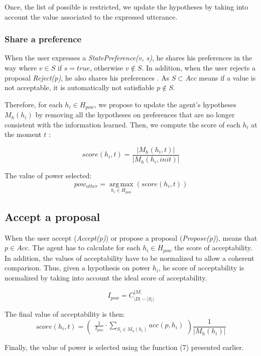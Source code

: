 \documentclass[conference, letterpaper]{IEEEtran}
\begin{document}
Once, the list of possible is restricted, we update the hypotheses by taking into account the value associated to the expressed utterance.

\subsubsection{Share a preference}
When the user expresses a \emph{StatePreference(v, s)}, he shares his preferences in the way where $v \in S$ if $s =true$, otherwise $v \notin S$. 
In addition, when the user rejects a proposal \emph{Reject(p)}, he also shares his preferences . As $S \subset Acc$ means if a value is not acceptable, it is automatically not satisfiable $p \notin S$. 

Therefore, for each  $h_i \in H_{pow}$, we propose to update the agent's hypotheses $M_h(h_i)$ by removing all the hypotheses on preferences that are no longer consistent with the information learned. 
Then, we compute the score of each $h_i$ at the moment $t$ :

$$score(h_i,t) = \frac{|M_h(h_i, t)|}{|M_h(h_i, init)|}$$

The value of power selected:
\begin{equation}
pow_{other} = \operatorname*{arg\,max}_{h_i \in H_{pow}} ( score(h_i,t))
\end{equation}

\subsection{Accept a proposal}
When the user accept (\emph{Accept(p)}) or propose a proposal (\emph{Propose(p)}), means that $p \in Acc$. 
The agent has to calculate for each $h_i \in H_{pow}$ the score of acceptability. In addition, the values of acceptability have to be normalized to allow a coherent comparison. Thus, given a hypothesis on power $h_i$, he score of acceptability is normalized by taking into account the ideal score of acceptability.

$$I_{pow} =  C_{|D|-|S_i|}^{|M|}$$


The final value of acceptability is then:
\begin{equation}
score(h_i, t)= \left( \begin{array}{c}  \frac{1}{I_{pow}} \cdot \sum_{S_i \in M_h(h_i) } acc(p, h_i) 
\end{array}\right) \frac{1}{| M_h(h_i)|}
\end{equation}

Finally, the value of power is selected using the function (7) presented earlier.
\end{document}
